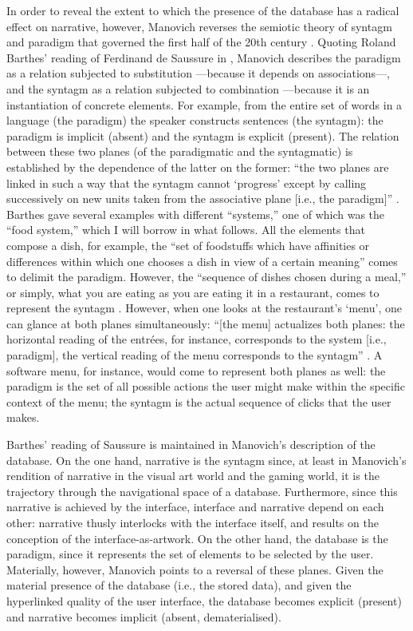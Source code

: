 
In order to reveal the extent to which the presence of the database has a radical effect on narrative, however, Manovich reverses the semiotic theory of syntagm and paradigm that governed the first half of the 20th century \parencite[231]{Man01:The}. Quoting Roland Barthes' reading of Ferdinand de Saussure in , Manovich describes the paradigm as a relation subjected to substitution ---because it depends on associations---, and the syntagm as a relation subjected to combination ---because it is an instantiation of concrete elements. For example, from the entire set of words in a language (the paradigm) the speaker constructs sentences (the syntagm): the paradigm is implicit (absent) and the syntagm is explicit (present). The relation between these two planes (of the paradigmatic and the syntagmatic) is established by the dependence of the latter on the former: ``the two planes are linked in such a way that the syntagm cannot `progress' except by calling successively on new units taken from the associative plane [i.e., the paradigm]'' \parencite[59]{Bar68:Ele}. Barthes gave several examples with different ``systems,'' one of which was the ``food system,'' which I will borrow in what follows. All the elements that compose a dish, for example, the ``set of foodstuffs which have affinities or differences within which one chooses a dish in view of a certain meaning'' comes to delimit the paradigm. However, the ``sequence of dishes chosen during a meal,'' or simply, what you are eating as you are eating it in a restaurant, comes to represent the syntagm \parencite[63]{Bar68:Ele}. However, when one looks at the restaurant's `menu', one can glance at both planes simultaneously: ``[the menu] actualizes both planes: the horizontal reading of the entrées, for instance, corresponds to the system [i.e., paradigm], the vertical reading of the menu corresponds to the syntagm'' \parencite[63]{Bar68:Ele}. A software menu, for instance, would come to represent both planes as well: the paradigm is the set of all possible actions the user might make within the specific context of the menu; the syntagm is the actual sequence of clicks that the user makes. 

Barthes' reading of Saussure is maintained in Manovich's description of the database. On the one hand, narrative is the syntagm since, at least in Manovich's rendition of narrative in the visual art world and the gaming world, it is the trajectory through the navigational space of a database. Furthermore, since this narrative is achieved by the interface, interface and narrative depend on each other: narrative thusly interlocks with the interface itself, and results on the conception of the interface-as-artwork. On the other hand, the database is the paradigm, since it represents the set of elements to be selected by the user. Materially, however, Manovich points to a reversal of these planes. Given the material presence of the database (i.e., the stored data), and given the hyperlinked quality of the user interface, the database becomes explicit (present) and narrative becomes implicit (absent, dematerialised).

